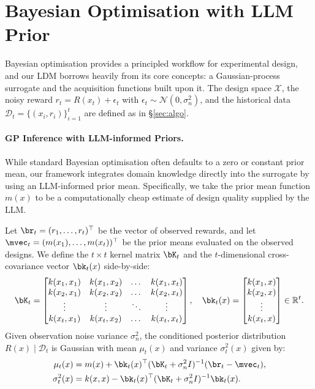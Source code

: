 
\section{Bayesian Optimisation with LLM Prior}
\label{sec:llm-bo}

Bayesian optimisation provides a principled workflow for experimental design, and our LDM borrows heavily from its core concepts: a Gaussian-process surrogate and the acquisition functions built upon it. The design space $\mathcal{X}$, the noisy reward $r_t = R(x_t) + \epsilon_t$ with $\epsilon_t \sim \mathcal{N}(0, \sigma_n^2)$, and the historical data $\mathcal{D}_t = \{(x_i, r_i)\}_{i=1}^{t}$ are defined as in \S\ref{sec:algo}.

\paragraph{GP Inference with LLM-informed Priors.}
While standard Bayesian optimisation often defaults to a zero or constant prior mean, our framework integrates domain knowledge directly into the surrogate by using an LLM-informed prior mean. Specifically, we take the prior mean function $m(x)$ to be a computationally cheap estimate of design quality supplied by the LLM.

Let $\br_t = (r_1, \dots, r_t)^\top$ be the vector of observed rewards, and let $\mvec_t = (m(x_1), \dots, m(x_t))^\top$ be the prior means evaluated on the observed designs. We define the $t \times t$ kernel matrix $\bK_t$ and the $t$-dimensional cross-covariance vector $\bk_t(x)$ side-by-side:
\begin{equation}
\bK_t =
\begin{bmatrix}
k(x_1, x_1) & k(x_1, x_2) & \dots & k(x_1, x_t) \\
k(x_2, x_1) & k(x_2, x_2) & \dots & k(x_2, x_t) \\
\vdots      & \vdots      & \ddots & \vdots      \\
k(x_t, x_1) & k(x_t, x_2) & \dots & k(x_t, x_t)
\end{bmatrix},\quad
\bk_t(x) =
\begin{bmatrix}
k(x_1, x) \\
k(x_2, x) \\
\vdots \\
k(x_t, x)
\end{bmatrix} \in \mathbb{R}^t.
\end{equation}
Given observation noise variance $\sigma_n^2$, the conditioned posterior distribution $R(x) \mid \mathcal{D}_t$ is Gaussian with mean $\mu_t(x)$ and variance $\sigma_t^2(x)$ given by:
\begin{align}
\mu_t(x) &= m(x) + \bk_t(x)^\top (\bK_t + \sigma_n^2 I)^{-1} (\br_t - \mvec_t), \label{eq:postmean} \\
\sigma_t^2(x) &= k(x, x) - \bk_t(x)^\top (\bK_t + \sigma_n^2 I)^{-1} \bk_t(x). \label{eq:postvar}
\end{align}

